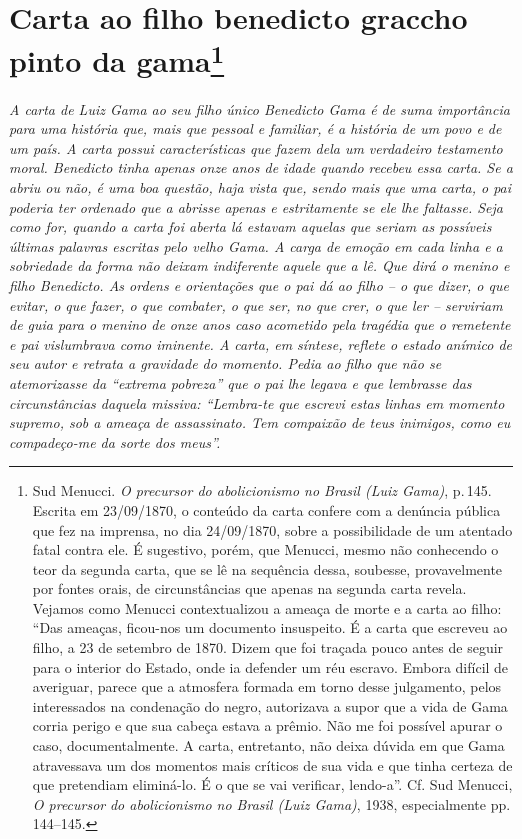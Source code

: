 \chapter{Carta ao filho benedicto graccho pinto da gama\footnote{Sud Menucci. \emph{O precursor do abolicionismo no
  Brasil (Luiz Gama)}, p.\,145. Escrita em 23/09/1870, o conteúdo da
  carta confere com a denúncia pública que fez na imprensa, no dia
  24/09/1870, sobre a possibilidade de um atentado fatal contra ele. É
  sugestivo, porém, que Menucci, mesmo não conhecendo o teor da segunda
  carta, que se lê na sequência dessa, soubesse, provavelmente por
  fontes orais, de circunstâncias que apenas na segunda carta revela.
  Vejamos como Menucci contextualizou a ameaça de morte e a carta ao
  filho: ``Das ameaças, ficou-nos um documento insuspeito. É a carta que
  escreveu ao filho, a 23 de setembro de 1870. Dizem que foi traçada
  pouco antes de seguir para o interior do Estado, onde ia defender um
  réu escravo. Embora difícil de averiguar, parece que a atmosfera
  formada em torno desse julgamento, pelos interessados na condenação do
  negro, autorizava a supor que a vida de Gama corria perigo e que sua
  cabeça estava a prêmio. Não me foi possível apurar o caso,
  documentalmente. A carta, entretanto, não deixa dúvida em que Gama
  atravessava um dos momentos mais críticos de sua vida e que tinha
  certeza de que pretendiam eliminá-lo. É o que se vai verificar,
  lendo-a''. Cf. Sud Menucci, \emph{O precursor} \emph{do abolicionismo
  no Brasil (Luiz Gama)}, 1938, especialmente pp.\,144--145.}} %

\begin{didascalia}
\emph{A carta de Luiz Gama ao seu filho único Benedicto Gama é de suma
importância para uma história que, mais que pessoal e familiar, é a
história de um povo e de um país. A carta possui características que
fazem dela um verdadeiro testamento moral. Benedicto tinha apenas onze
anos de idade quando recebeu essa carta. Se a abriu ou não, é uma boa
questão, haja vista que, sendo mais que uma carta, o pai poderia ter
ordenado que a abrisse apenas e estritamente se ele lhe faltasse. Seja
como for, quando a carta foi aberta lá estavam aquelas que seriam as
possíveis últimas palavras escritas pelo velho Gama. A carga de emoção
em cada linha e a sobriedade da forma não deixam indiferente aquele que
a lê. Que dirá o menino e filho Benedicto. As ordens e orientações que o
pai dá ao filho -- o que dizer, o que evitar, o que fazer, o que
combater, o que ser, no que crer, o que ler -- serviriam de guia para o
menino de onze anos caso acometido pela tragédia que o remetente e pai
vislumbrava como iminente. A carta, em síntese, reflete o estado anímico
de seu autor e retrata a gravidade do momento. Pedia ao filho que não se
atemorizasse da ``extrema pobreza'' que o pai lhe legava e que lembrasse
das circunstâncias daquela missiva: ``Lembra-te que escrevi estas linhas
em momento supremo, sob a ameaça de assassinato. Tem compaixão de teus
inimigos, como eu compadeço-me da sorte dos meus''.}
\end{didascalia}


